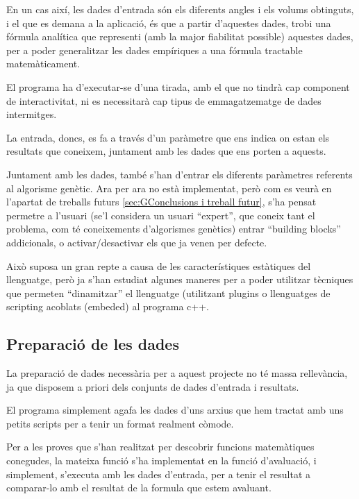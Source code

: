 En un cas així, les dades d'entrada són els diferents angles i els volums
obtinguts, i el que es demana a la aplicació, és que a partir d'aquestes dades,
trobi una fórmula analítica que representi (amb la major fiabilitat possible)
aquestes dades, per a poder generalitzar les dades empíriques a una fórmula
tractable matemàticament.

El programa ha d'executar-se d'una tirada, amb el que no tindrà cap component de
interactivitat, ni es necessitarà cap tipus de emmagatzematge de dades
intermitges.

La entrada, doncs, es fa a través d'un paràmetre que ens indica on estan els
resultats que coneixem, juntament amb les dades que ens porten a aquests.

Juntament amb les dades, també s'han d'entrar els diferents paràmetres referents
al algorisme genètic.  Ara per ara no està implementat, però com es veurà en
l'apartat de treballs futurs \ref{sec:GConclusions i treball futur}, s'ha pensat
permetre a l'usuari (se'l considera un usuari ``expert'', que coneix tant el
problema, com té coneixements d'algorismes genètics) entrar ``building blocks''
addicionals, o activar/desactivar els que ja venen per defecte.

Això suposa un gran repte a causa de les característiques estàtiques del
llenguatge, però ja s'han estudiat algunes maneres per a poder utilitzar
tècniques que permeten ``dinamitzar'' el llenguatge (utilitzant plugins o
llenguatges de scripting acoblats (embeded) al programa c++.


\subsection{Preparació de les dades} %
\label{sub:GPreparacio de dades}

La preparació de dades necessària per a aquest projecte no té massa rellevància,
ja que disposem a priori dels conjunts de dades d'entrada i resultats.

El programa simplement agafa les dades d'uns arxius que hem tractat amb uns
petits scripts per a tenir un format realment còmode.

Per a les proves que s'han realitzat per descobrir funcions matemàtiques
conegudes, la mateixa funció s'ha implementat en la funció d'avaluació, i
simplement, s'executa amb les dades d'entrada, per a tenir el resultat a
comparar-lo amb el resultat de la formula que estem avaluant.


